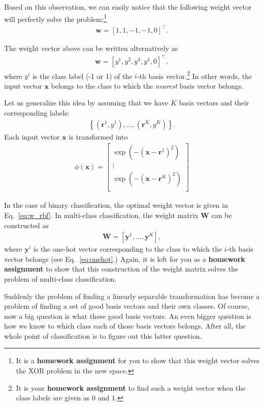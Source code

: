 \documentclass{report}
\newcommand{\vect}[1]{\mathbf{#1}}
\newcommand{\matr}[1]{\mathbf{#1}}
\newcommand{\vx}[0]{\vect{x}}
\newcommand{\vw}[0]{\vect{w}}
\newcommand{\vy}[0]{\vect{y}}
\newcommand{\vr}[0]{\vect{r}}
\newcommand{\mW}[0]{\matr{W}}
\begin{document}
Based on this observation, we can easily notice that the following weight vector
will perfectly solve the problem:\footnote{
    It is a {\bf homework assignment} for you to show that this weight vector
    solves the XOR problem in the new space. 
}
\begin{align*}
    \vw = \left[ 1, 1, -1, -1, 0 \right]^\top.
\end{align*}

The weight vector above can be written alternatively as 
\begin{align}
    \label{eq:w_rbf}
    \vw = \left[ y^1, y^2, y^3, y^4, 0\right]^\top,
\end{align}
where $y^i$ is the class label (-1 or 1) of the $i$-th basis vector.\footnote{
    It is your {\bf homework assignment} to find such a weight vector when the
    class labels are given as $0$ and $1$.
}
In other words, the input vector $\vx$ belongs to the class to which the {\it
nearest} basis vector belongs. 

Let us generalize this idea by assuming that we have $K$ basis vectors and their
corresponding labels:
\begin{align*}
    \left\{ (\vr^1, y^1), \ldots, (\vr^K, y^K) \right\}.
\end{align*}
Each input vector $\vx$ is transformed into
\begin{align}
    \label{eq:W_rbf}
    \phi(\vx) = \left[ 
        \begin{array}{c}
            \exp\left( -(\vx - \vr^1)^2 \right)  \\
            \vdots \\
            \exp\left( -(\vx - \vr^K)^2 \right)  \\
        \end{array}
    \right]
\end{align}

In the case of binary classification, the optimal weight vector is given in
Eq.~\eqref{eq:w_rbf}. In multi-class classification, the weight matrix $\mW$ can
be constructed as
\begin{align*}
    \mW = \left[
        \vy^1, \ldots, \vy^K
    \right],
\end{align*}
where $\vy^i$ is the one-hot vector corresponding to the class to which the
$i$-th basis vector belongs (see Eq.~\eqref{eq:onehot}.) Again, it is left for
you as a {\bf homework assignment} to show that this construction of the weight
matrix solves the problem of multi-class classification.

Suddenly the problem of finding a linearly separable transformation has become a
problem of finding a set of good basis vectors and their own classes. Of course,
now a big question is what these good basis vectors. An even bigger question is
how we know to which class each of those basis vectors belongs. After all, the
whole point of classification is to figure out this latter question.
\end{document}
